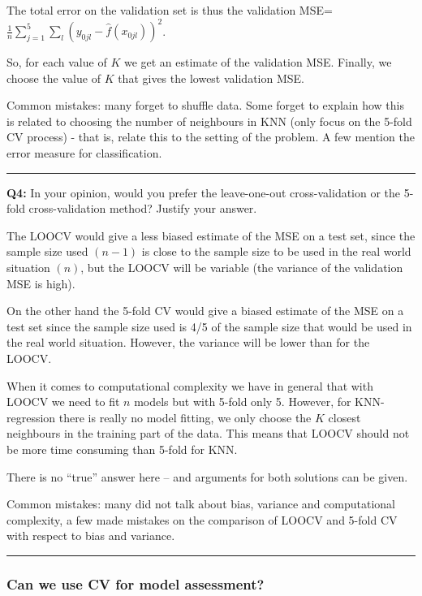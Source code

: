 \documentclass[]{article}
\begin{document}
The total error on the validation set is thus the validation
MSE=\(\frac{1}{n}\sum_{j=1}^5 \sum_{l}(y_{0jl}-\hat{f}(x_{0jl}))^2\).

So, for each value of \(K\) we get an estimate of the validation MSE.
Finally, we choose the value of \(K\) that gives the lowest validation
MSE.

Common mistakes: many forget to shuffle data. Some forget to explain how
this is related to choosing the number of neighbours in KNN (only focus
on the 5-fold CV process) - that is, relate this to the setting of the
problem. A few mention the error measure for classification.

\begin{center}\rule{0.5\linewidth}{\linethickness}\end{center}

\textbf{Q4:} In your opinion, would you prefer the leave-one-out
cross-validation or the 5-fold cross-validation method? Justify your
answer.

The LOOCV would give a less biased estimate of the MSE on a test set,
since the sample size used \((n-1)\) is close to the sample size to be
used in the real world situation \((n)\), but the LOOCV will be variable
(the variance of the validation MSE is high).

On the other hand the 5-fold CV would give a biased estimate of the MSE
on a test set since the sample size used is 4/5 of the sample size that
would be used in the real world situation. However, the variance will be
lower than for the LOOCV.

When it comes to computational complexity we have in general that with
LOOCV we need to fit \(n\) models but with 5-fold only 5. However, for
KNN-regression there is really no model fitting, we only choose the
\(K\) closest neighbours in the training part of the data. This means
that LOOCV should not be more time consuming than 5-fold for KNN.

There is no ``true'' answer here -- and arguments for both solutions can
be given.

Common mistakes: many did not talk about bias, variance and
computational complexity, a few made mistakes on the comparison of LOOCV
and 5-fold CV with respect to bias and variance.

\begin{center}\rule{0.5\linewidth}{\linethickness}\end{center}

\hypertarget{can-we-use-cv-for-model-assessment}{%
\subsubsection{Can we use CV for model
assessment?}\label{can-we-use-cv-for-model-assessment}}
\end{document}
